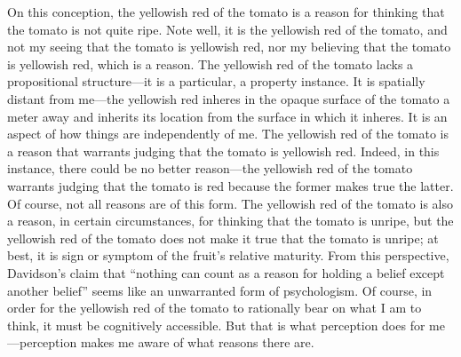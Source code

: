 \documentclass[12pt]{article}
\begin{document}
On this conception, the yellowish red of the tomato is a reason for thinking that the tomato is not quite ripe. Note well, it is the yellowish red of the tomato, and not my seeing that the tomato is yellowish red, nor my believing that the tomato is yellowish red, which is a reason. The yellowish red of the tomato lacks a propositional structure---it is a particular, a property instance. It is spatially distant from me---the yellowish red inheres in the opaque surface of the tomato a meter away and inherits its location from the surface in which it inheres. It is an aspect of how things are independently of me. The yellowish red of the tomato is a reason that warrants judging that the tomato is yellowish red. Indeed, in this instance, there could be no better reason---the yellowish red of the tomato warrants judging that the tomato is red because the former makes true the latter. Of course, not all reasons are of this form. The yellowish red of the tomato is also a reason, in certain circumstances, for thinking that the tomato is unripe, but the yellowish red of the tomato does not make it true that the tomato is unripe; at best, it is sign or symptom of the fruit's relative maturity. From this perspective, Davidson's claim that ``nothing can count as a reason for holding a belief except another belief'' seems like an unwarranted form of psychologism. Of course, in order for the yellowish red of the tomato to rationally bear on what I am to think, it must be cognitively accessible. But that is what perception does for me---perception makes me aware of what reasons there are. 
\end{document}
